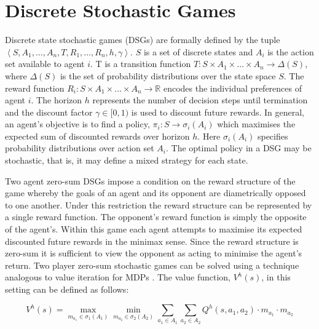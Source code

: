 \section{Discrete Stochastic Games}
\label{sec:dsg}
Discrete state stochastic games (DSGs) are formally defined by the tuple
$ \left\langle S, A_{1}, \ldots, A_{n}, T, R_{1}, \ldots, R_{n}, h, \gamma\right\rangle$.
$S$ is a set of discrete states and $A_i$ is the action set available to agent 
$i$. T is a transition function $T : S \times A_1 \times \ldots \times A_n \rightarrow \Delta(S)$, 
where $\Delta(S)$ is the set of probability distributions over the state space $S$. 
The reward function $R_i : S \times A_1 \times \ldots \times A_n \rightarrow \mathbb{R}$ 
encodes the individual preferences of agent $i$. The horizon $h$ represents the 
number of decision steps until termination and the discount factor $\gamma \in [0, 1)$ 
is used to discount future rewards. In general, an agent's objective is 
to find a policy, $\pi_i : S \rightarrow \sigma_i(A_i)$ which maximises the expected 
sum of discounted rewards over horizon $h$. Here $\sigma_i(A_i)$ specifies
probability distributions over action set $A_i$. The optimal policy in a 
DSG may be stochastic, that is, it may define a mixed strategy for each state. 


Two agent zero-sum DSGs impose a condition on the reward structure 
of the game whereby the goals of an agent and its opponent are diametrically
opposed to one another. Under this restriction the reward structure can 
be represented by a single reward function. The opponent's
reward function is simply the opposite of the agent's. Within this game 
each agent attempts to maximise its expected discounted future rewards 
in the minimax sense. Since the reward structure is zero-sum it is sufficient to view the 
opponent as acting to minimise the agent's return. Two player zero-sum 
stochastic games can be solved using a technique analogous to value 
iteration for MDPs \cite{Littman_ICML_1994}. The value function, $V^{h}(s)$,
in this setting can be defined as follows:

{\footnotesize 
\begin{equation}
\label{eq:dsgvfunc}
  V^{h}(s) = \max_{m_{a_{1}} \in \sigma_1(A_1)}\min_{m_{a_{2}} \in \sigma_2(A_2)} \sum_{a_1 \in A_1} \sum_{a_2 \in A_2} Q^{h}(s, a_1, a_2) \cdot m_{a_{1}} \cdot m_{a_{2}}
\end{equation}
}%

